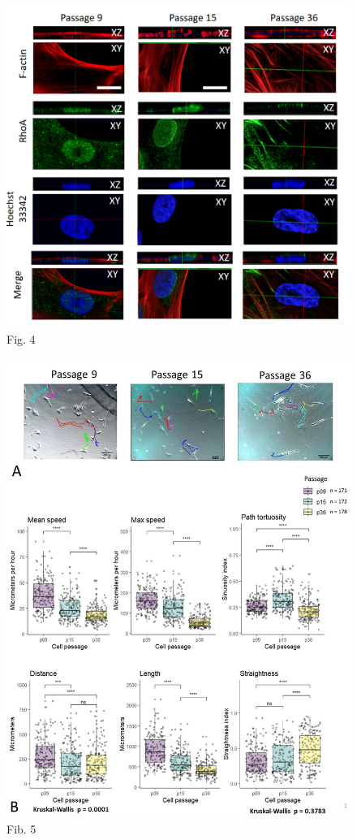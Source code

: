 \documentclass[alpha-refs]{wiley-article}
\begin{document}
\begin{figure}[hbt!]
  \includegraphics[width=0.9\linewidth]{rho-3d.png}
  \caption{Fig. 4}
  \centering
\end{figure}

\begin{figure}[hbt!]
  \includegraphics[width=1\linewidth]{traj.jpg}
  \caption{Fib. 5}
  \centering
\end{figure}
\end{document}
